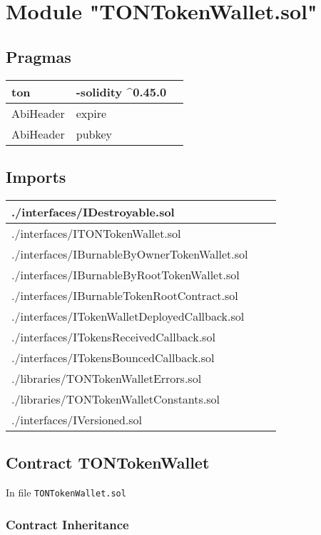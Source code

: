 
\section{Module "TONTokenWallet.sol"}


\subsection{Pragmas}


\noindent\begin{tabular}{|l|l|p{5cm}|}\hline
ton & -solidity \^{}0.45.0 &\\\hline
AbiHeader &  expire &\\\hline
AbiHeader &  pubkey &\\\hline
\end{tabular}


\subsection{Imports}


\noindent\begin{tabular}{|l|l|p{5cm}|}\hline
./interfaces/IDestroyable.sol &\\\hline
./interfaces/ITONTokenWallet.sol &\\\hline
./interfaces/IBurnableByOwnerTokenWallet.sol &\\\hline
./interfaces/IBurnableByRootTokenWallet.sol &\\\hline
./interfaces/IBurnableTokenRootContract.sol &\\\hline
./interfaces/ITokenWalletDeployedCallback.sol &\\\hline
./interfaces/ITokensReceivedCallback.sol &\\\hline
./interfaces/ITokensBouncedCallback.sol &\\\hline
./libraries/TONTokenWalletErrors.sol &\\\hline
./libraries/TONTokenWalletConstants.sol &\\\hline
./interfaces/IVersioned.sol &\\\hline
\end{tabular}


\subsection{Contract TONTokenWallet}


In file {\tt TONTokenWallet.sol}

\subsubsection{Contract Inheritance}


